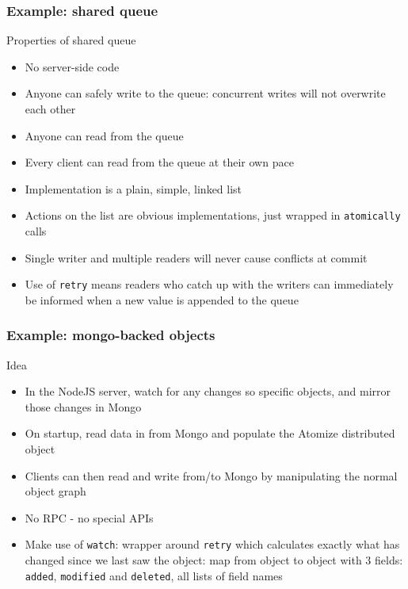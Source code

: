 \documentclass{beamer}
\begin{document}
\begin{frame}
  \frametitle{Example: shared queue}

  \begin{block}{Properties of shared queue}
    \begin{itemize}
    \item
      No server-side code
    \item
      Anyone can safely write to the queue: concurrent writes will not
      overwrite each other
    \item
      Anyone can read from the queue
    \item
      Every client can read from the queue at their own pace
    \item
      Implementation is a plain, simple, linked list
    \item
      Actions on the list are obvious implementations, just wrapped in
      \texttt{atomically} calls
    \item
      Single writer and multiple readers will never cause conflicts at commit
    \item
      Use of \texttt{retry} means readers who catch up with the
      writers can immediately be informed when a new value is appended
      to the queue
    \end{itemize}
  \end{block}
\end{frame}

\begin{frame}
  \frametitle{Example: mongo-backed objects}

  \begin{block}{Idea}
    \begin{itemize}
    \item
      In the NodeJS server, watch for any changes so specific objects,
      and mirror those changes in Mongo
    \item
      On startup, read data in from Mongo and populate the Atomize
      distributed object
    \item
      Clients can then read and write from/to Mongo by manipulating
      the normal object graph
    \item
      No RPC - no special APIs
    \item
      Make use of \texttt{watch}: wrapper around \texttt{retry} which
      calculates exactly what has changed since we last saw the
      object: map from object to object with 3 fields: \texttt{added},
      \texttt{modified} and \texttt{deleted}, all lists of field names
    \end{itemize}
  \end{block}
\end{frame}
\end{document}
